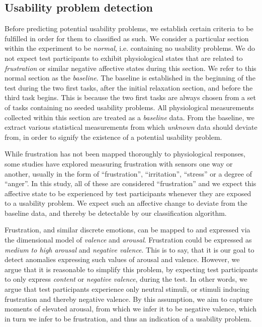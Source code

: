 \subsection{Usability problem detection}
Before predicting potential usability problems, we establish certain criteria to be fulfilled in order for them to
classified as such.  We consider a particular section within the experiment to be \textit{normal}, i.e. containing no
usability problems.  We do not expect test participants to exhibit physiological states that are related to
\textit{frustration} or similar negative affective states during this section. We refer to this normal section as the
\textit{baseline}. The baseline is established in the beginning of the test during the two first tasks, after the
initial relaxation section, and before the third task begins. This is because the two first tasks are always chosen from
a set of tasks containing no seeded usability problems. All physiological measurements collected within this section are
treated as a \textit{baseline} data.  From the baseline, we extract various statistical measurements from which
\textit{unknown} data should deviate from, in order to signify the existence of a potential usability problem.

While frustration has not been mapped thoroughly to physiological responses, some studies have explored measuring
frustration with sensors one way or another, usually in the form of ``frustration'', ``irritation'', ``stress'' or a
degree of ``anger''. In this study, all of these are considered ``frustration'' and we expect this affective state to be
experienced by test participants whenever they are exposed to a usability problem. We expect such an affective change
to deviate from the baseline data, and thereby be detectable by our classification algorithm.

Frustration, and similar discrete emotions, can be mapped to and expressed via the dimensional model of \textit{valence}
and \textit{arousal}. Frustration could be expressed as \textit{medium to high arousal} and \textit{negative
  valence}. This is to say, that it is our goal to detect anomalies expressing such values of arousal and
valence. However, we argue that it is reasonable to simplify this problem, by expecting test participants to only
express \textit{content} or \textit{negative valence}, during the test. In other words, we argue that test participants
experience only neutral stimuli, or stimuli inducing frustration and thereby negative valence. By this assumption, we
aim to capture moments of elevated arousal, from which we infer it to be negative valence, which in turn we infer to be
frustration, and thus an indication of a usability problem.


